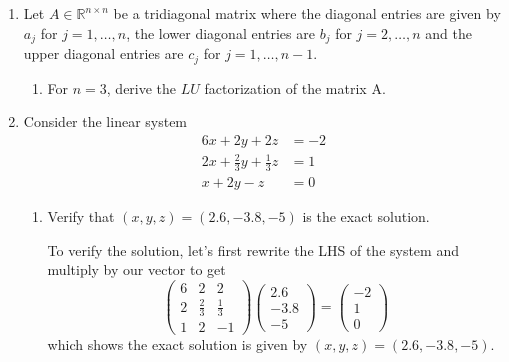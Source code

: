 \documentclass[a4paper,12pt]{article}
\newcommand{\reals}{\mathbb{R}}
\newcommand{\pmat}[1]{\begin{pmatrix} #1 \end{pmatrix}}
\begin{document}
\begin{enumerate}[label = \arabic*.]
	\item Let $ A \in \reals^{n \times n} $ be a tridiagonal matrix where the diagonal entries are given by $ a_j $ for $ j = 1, \ldots, n $, the lower diagonal entries are $ b_j $ for $ j = 2, \ldots, n $ and the upper diagonal entries are $ c_j $ for $ j = 1, \ldots, n-1 $.
	\begin{enumerate}[label = (\alph*)]
		\item For $ n = 3 $, derive the $ LU $ factorization of the matrix A.
		
		
	\end{enumerate}

	\item Consider the linear system
	\begin{align*}
		6x + 2y + 2z &= -2 \\
		2x + \frac{2}{3}y + \frac{1}{3} z &= 1 \\
		x + 2y - z &= 0
	\end{align*}

	\begin{enumerate}[label = (\alph*)]
		\item Verify that $ (x,y,z) = (2.6, -3.8, -5) $ is the exact solution.
			
			To verify the solution, let's first rewrite the LHS of the system and multiply by our vector to get
			\[
				\pmat{
					6 & 2 & 2 \\
					2 & \frac{2}{3} & \frac{1}{3} \\
					1 & 2 & -1
				}\pmat{
					2.6 \\
					-3.8 \\
					-5
				} = \pmat{
					-2 \\
					1 \\
					0
				}
			\]
			which shows the exact solution is given by $ (x,y,z) = (2.6, -3.8, -5) $.
			

\end{enumerate}
\end{enumerate}
\end{document}
